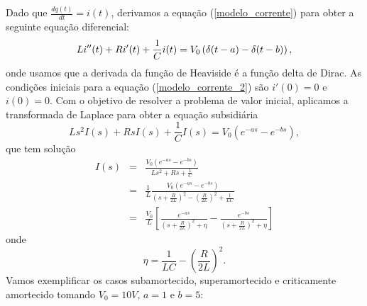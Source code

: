 Dado que $\frac{dq(t)}{dt}=i(t)$, derivamos a equação (\ref{modelo_corrente}) para obter a seguinte equação diferencial:
\begin{equation}{\label{modelo_corrente_2}}
Li''(t)+ Ri'(t)+\frac{1}{C}i(t)=V_0\left(\delta(t-a)-\delta(t-b)\right),
\end{equation}
onde usamos que a derivada da função de Heaviside é a função delta de Dirac. As condições iniciais para a equação (\ref{modelo_corrente_2}) são $i'(0)=0$ e $i(0)=0$. Com o objetivo de resolver a problema de valor inicial, aplicamos a transformada de Laplace para obter a equação subsidiária
\begin{equation*}
Ls^2I(s)+ RsI(s)+\frac{1}{C}I(s)=V_0\left(e^{-as}-e^{-bs}\right),
\end{equation*}
que tem solução
\begin{eqnarray*}
I(s)&=&\frac{V_0\left(e^{-as}-e^{-bs}\right)}{Ls^2+Rs+\frac{1}{C}}\\
&=&\frac{1}{L}\frac{V_0\left(e^{-as}-e^{-bs}\right)}{\left(s+\frac{R}{2L}\right)^2-\left(\frac{R}{2L}\right)^2+\frac{1}{LC}}\\
&=&\frac{V_0}{L}\left[\frac{e^{-as}}{\left(s+\frac{R}{2L}\right)^2+\eta}-\frac{e^{-bs}}{\left(s+\frac{R}{2L}\right)^2+\eta}\right]
\end{eqnarray*}
onde
$$
\eta=\frac{1}{LC}-\left(\frac{R}{2L}\right)^2.
$$
Vamos exemplificar os casos subamortecido, superamortecido e criticamente amortecido tomando $V_0=10V$, $a=1$ e $b=5$:
